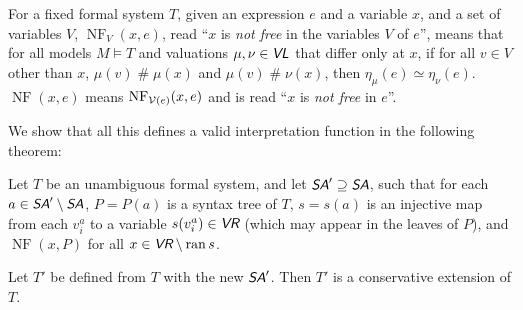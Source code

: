 \documentclass[runningheads,a4paper]{llncs}
\newcommand{\vr}{\textit{\textsf{VR}}} %
\newcommand{\vl}{\textit{\textsf{VL}}} %
\newcommand{\sa}{\textit{\textsf{SA}}} %
\newcommand{\fresh}{\mathbin{\#}}
\DeclareMathOperator{\ran}{ran}
\DeclareMathOperator{\NF}{NF}
\begin{document}
\begin{definition}\label{def:nf}
For a fixed formal system $T$, given an expression $e$ and a variable $x$, and a set of variables $V$, $\NF_V(x,e)$, read ``$x$ is {\em not free} in the variables $V$ of $e$'', means that for all models $M\models T$ and valuations $\mu,\nu\in\vl$ that differ only at $x$, if for all $v\in V$ other than $x$, $\mu(v)\fresh\mu(x)$ and $\mu(v)\fresh\nu(x)$, then $\eta_\mu(e)\simeq\eta_\nu(e)$. $\NF(x,e)$ means $\NF_{{\cal V}(e)}(x,e)$ and is read ``$x$ is {\em not free} in $e$''.
\end{definition}

We show that all this defines a valid interpretation function in the following theorem:

\begin{theorem}\label{thm:defncext}
Let $T$ be an unambiguous formal system, and let $\sa'\supseteq\sa$, such that for each $a\in\sa'\setminus\sa$, $P=P(a)$ is a syntax tree of $T$, $s=s(a)$ is an injective map from each $v^a_i$ to a variable $s(v^a_i)\in\vr$ (which may appear in the leaves of $P$), and $\NF(x,P)$ for all $x\in\vr\setminus\ran s$.

Let $T'$ be defined from $T$ with the new $\sa'$. Then $T'$ is a conservative extension of $T$.
\end{theorem}
\end{document}
